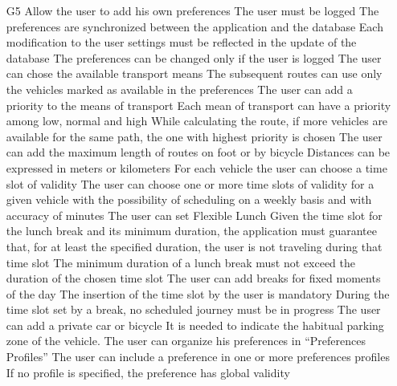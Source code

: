 \begin{itemize}
	\subsubitem[R4.2.1]The user can request for the access using the telephone number
	\subsubitem[R4.2.2]The system must be able to send an SMS to the provided number with a verification code of 4 digits
	\subsubitem[R4.2.3]The user can complete the login if the verification code inserted by the user matches the one generated by the system
	\item[G5] Allow the user to add his own preferences
	\subitem[G5.1] The user must be logged
	\subitem[G5.2] The preferences are synchronized between the application and the database
	\subsubitem[R5.2.1]Each modification to the user settings must be reflected in the update of the database
	\subsubitem[R5.2.2]The preferences can be changed only if the user is logged
	\subitem[G5.3] The user can chose the available transport means
	\subsubitem[R5.3.1]The subsequent routes can use only the vehicles marked as available in the preferences
	\subitem[G5.4] The user can add a priority to the means of transport
	\subsubitem[R5.4.1]Each mean of transport can have a priority among low, normal and high
	\subsubitem[R5.4.2]While calculating the route, if more vehicles are available for the same path, the one with highest priority is chosen
	\subitem[G5.5] The user can add the maximum length of routes on foot or by bicycle
	\subsubitem[R5.5.1]Distances can be expressed in meters or kilometers
	\subitem[G5.6] For each vehicle the user can choose a time slot of validity
	\subsubitem[R5.6.1]The user can choose one or more time slots of validity for a given vehicle with the possibility of scheduling on a weekly basis and with accuracy of minutes
	\subitem[G5.7] The user can set Flexible Lunch
	\subsubitem[R5.7.1]Given the time slot for the lunch break and its minimum duration, the application must guarantee that, for at least the specified duration, the user is not traveling during that time slot
	\subsubitem[R5.7.2]The minimum duration of a lunch break must not exceed the duration of the chosen time slot
	\subitem[G5.8] The user can add breaks for fixed moments of the day
	\subsubitem[R5.8.1]The insertion of the time slot by the user is mandatory
	\subsubitem[R5.8.2]During the time slot set by a break, no scheduled journey must be in progress
	\subitem[G5.9] The user can add a private car or bicycle
	\subsubitem[R5.9.1]It is needed to indicate the habitual parking zone of the vehicle.
	\subitem[G5.10] The user can organize his preferences in “Preferences Profiles”
	\subsubitem[R5.10.1]The user can include a preference in one or more preferences profiles
	\subsubitem[R5.10.2]If no profile is specified, the preference has global validity
	

\end{itemize}

